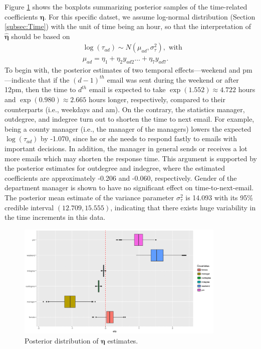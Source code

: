 \documentclass[ba]{imsart}
\numberwithin{equation}{section}
\theoremstyle{plain}
\begin{document}
	Figure \ref{figure:etaresults} shows the boxplots summarizing posterior samples of the time-related coefficients $\boldsymbol{\eta}$. For this specific datset, we assume log-normal distribution (Section \ref{subsec:Time}) with the unit of time being an hour, so that the interpretation of $\hat{\boldsymbol{\eta}}$ should be based on
	\begin{equation*}
	\begin{aligned}
	&\log(\tau_{ad}) \sim N(\mu_{ad}, \sigma_\tau^2), \mbox{ with }\\
	&\mu_{ad} = \eta_{1}+\eta_{2} y_{ad2}\ldots+\eta_{7}y_{ad7}.
	\end{aligned}
	\end{equation*}
	To begin with, the posterior estimates of two temporal effects---weekend and pm---indicate that if the ${(d-1)}^{th}$ email was sent during the weekend or after 12pm, then the time to $d^{th}$ email is expected to take $\exp(1.552)\approx 4.722$ hours and $\exp(0.980)\approx2.665$ hours longer, respectively, compared to their counterparts (i.e., weekdays and am). On the contrary, the statistics manager, outdegree, and indegree turn out to shorten the time to next email. For example, being a county manager (i.e., the manager of the managers) lowers the expected $\log(\tau_{ad})$ by -1.070, since he or she needs to respond fastly to emails with important decisions. In addition, the manager in general sends or receives a lot more emails which may shorten the response time. This argument is supported by the posterior estimates for outdegree and indegree, where the estimated coefficients are approximately -0.206 and -0.060, respectively. Gender of the department manager is shown to have no significant effect on time-to-next-email. The posterior mean estimate of the variance parameter $\sigma^2_\tau$ is 14.093 with its 95\% credible interval $(12.709, 15.555)$, indicating that there exists huge variability in the time increments in this data.
		\begin{figure}[!t]
			\centering
			\includegraphics[width=0.89\textwidth]{img/etaest-1.png}	
			\caption {Posterior distribution of $\boldsymbol{\eta}$ estimates.}
			\label{figure:etaresults}
		\end{figure}
	
\end{document}
